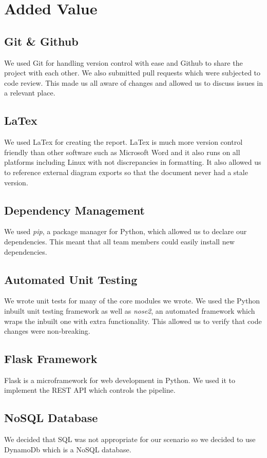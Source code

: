 \chapter{Added Value}

  \section{Git \& Github}
  We used Git for handling version control with ease and Github to share the project with each other.
  We also submitted pull requests which were subjected to code review. This made us all aware of
  changes and allowed us to discuss issues in a relevant place.

  \section{LaTex}
  We used LaTex for creating the report. LaTex is much more version control friendly than other
  software such as Microsoft Word and it also runs on all platforms including Linux with not
  discrepancies in formatting. It also allowed us to reference external diagram exports so that
  the document never had a stale version.

  \section{Dependency Management}
  We used \emph{pip}, a package manager for Python, which allowed us to declare our dependencies.
  This meant that all team members could easily install new dependencies.

  \section{Automated Unit Testing}
  We wrote unit tests for many of the core modules we wrote. We used the Python inbuilt unit testing
  framework as well as \emph{nose2}, an automated framework which wraps the inbuilt one with extra
  functionality. This allowed us to verify that code changes were non-breaking.

  \section{Flask Framework}
  Flask is a microframework for web development in Python. We used it to implement the REST API
  which controls the pipeline.

  \section{NoSQL Database}
  We decided that SQL was not appropriate for our scenario so we decided to use DynamoDb which is a
  NoSQL database.

